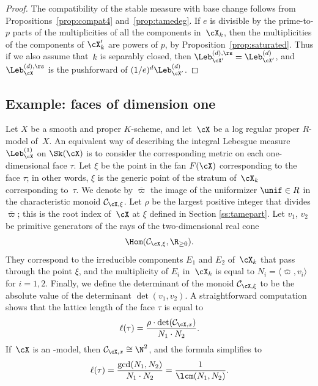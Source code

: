 \begin{proof}
The compatibility of the stable measure with base change follows from Propositions~\ref{prop:compat4} and~\ref{prop:tamedeg}.
If $e$ is divisible by the prime-to-$p$ parts of the multiplicities of all the components in~$\cX_k$, then the multiplicities of the components of $\cX'_k$ are powers of $p$,
by Proposition~\ref{prop:saturated}. Thus if we also assume that~$k$ is separably closed, then $\Leb^{(d),\rs}_{\cX'}=\Leb^{(d)}_{\cX'}$, and
$\Leb^{(d),\rs}_{\cX}$ is the pushforward of $(1/e)^d\Leb^{(d)}_{\cX'}$.
\end{proof}

\subsection{Example: faces of dimension one}\label{sec:curve}
Let $X$ be a smooth and proper $K$\nobreakdash-scheme, and let~$\cX$ be a log regular proper $R$\nobreakdash-model of~$X$.
An equivalent way of describing the integral Lebesgue measure $\Leb^{(1)}_{\cX}$ on $\Sk(\cX)$
is to consider the corresponding metric on each one-dimensional face $\tau$. Let $\xi$ be the point in the fan $F(\cX)$ corresponding to the face $\tau$; in other words,
$\xi$ is the generic point of the stratum of~$\cX_k$ corresponding to~$\tau$. We denote by $\overline{\varpi}$ the image of the uniformizer $\unif\in R$ in the characteristic monoid $\mathcal{C}_{\cX,\xi}$.
Let $\rho$ be the largest positive integer that divides $\overline{\varpi}$; this is the root index of~$\cX$ at $\xi$ defined in Section \ref{ss:tamepart}.
Let $v_1$, $v_2$ be primitive generators of the rays of the two-dimensional real cone
\[
\Hom(\mathcal{C}_{\cX,\xi},\R_{\geq 0}).
\]
They correspond to the irreducible components $E_1$ and $E_2$ of~$\cX_k$ that pass through the point $\xi$, and the multiplicity of $E_i$ in~$\cX_k$ is equal to
$N_i=\langle \overline{\varpi},v_i \rangle$ for $i=1,2$. Finally, we define the determinant of the monoid $\mathcal{C}_{\cX,\xi}$ to be the absolute value of the determinant $\det(v_1,v_2)$.
A straightforward computation shows that the
lattice length of the face $\tau$ is equal to
\[
\ell(\tau)= \frac{\rho\cdot \det(\mathcal{C}_{\cX,x})}{N_1\cdot N_2}.
\]
If~$\cX$ is an \snc-model, then $\mathcal{C}_{\cX,x}\cong \N^2$, and the formula simplifies to
\[
\ell(\tau)= \frac{\gcd(N_1,N_2)}{N_1\cdot N_2}=\frac{1}{\lcm(N_1,N_2)}.
\]

